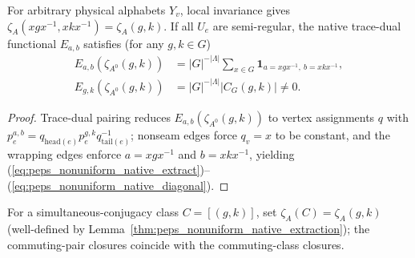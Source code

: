 \begin{lemma}%
    \label{thm:peps_nonuniform_native_extraction}
    \leanok
    For arbitrary physical alphabets $Y_v$, local invariance gives
    $\zeta_A(xgx^{-1},xkx^{-1})=\zeta_A(g,k)$. If all $U_e$ are semi-regular,
    the native trace-dual functional $E_{a,b}$ satisfies (for any $g,k\in G$)
    \begin{align}
        E_{a,b}(\zeta_{A^0}(g,k))
         & =|G|^{-|\Lambda|}\sum_{x\in G}
        \mathbf1_{a=xgx^{-1},\ b=xkx^{-1}},
        \label{eq:peps_nonuniform_native_extract} \\
        E_{g,k}(\zeta_{A^0}(g,k))
         & =|G|^{-|\Lambda|}|C_G(g,k)|\ne0.
        \label{eq:peps_nonuniform_native_diagonal}
    \end{align}
\end{lemma}
\begin{proof}\leanok
    Trace-dual pairing reduces $E_{a,b}(\zeta_{A^0}(g,k))$ to vertex assignments
    $q$ with $p^{a,b}_e=q_{\mathrm{head}(e)}p^{g,k}_eq_{\mathrm{tail}(e)}^{-1}$;
    nonseam edges force $q_v=x$ to be constant, and the wrapping edges enforce
    $a=xgx^{-1}$ and $b=xkx^{-1}$, yielding
    (\ref{eq:peps_nonuniform_native_extract})--(\ref{eq:peps_nonuniform_native_diagonal}).
\end{proof}

\begin{definition}%
    \label{def:peps_nonuniform_native_classes}
    \leanok
    For a simultaneous-conjugacy class $C=[(g,k)]$, set $\zeta_A(C)=\zeta_A(g,k)$
    (well-defined by Lemma~\ref{thm:peps_nonuniform_native_extraction}); the
    commuting-pair closures coincide with the commuting-class closures.
\end{definition}

